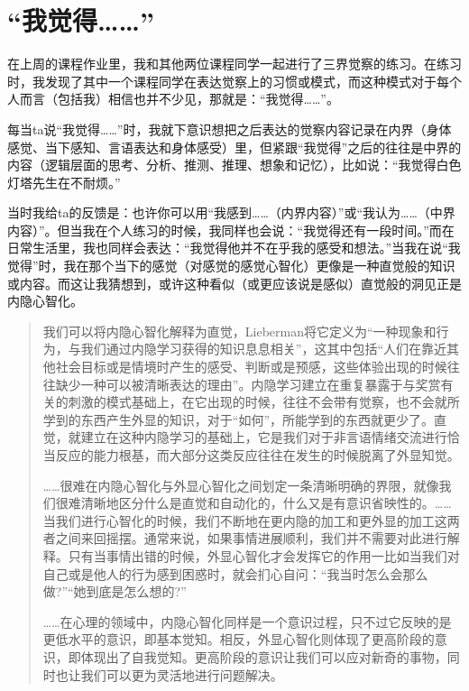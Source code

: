 \chapter{“我觉得……”}





在上周的课程作业里，我和其他两位课程同学一起进行了三界觉察的练习。在练习时，我发现了其中一个课程同学在表达觉察上的习惯或模式，而这种模式对于每个人而言（包括我）相信也并不少见，那就是：“我觉得……”。

每当ta说“我觉得……”时，我就下意识想把之后表达的觉察内容记录在内界（身体感觉、当下感知、言语表达和身体感受）里，但紧跟“我觉得”之后的往往是中界的内容（逻辑层面的思考、分析、推测、推理、想象和记忆），比如说：“我觉得白色灯塔先生在不耐烦。”

当时我给ta的反馈是：也许你可以用“我感到……（内界内容）”或“我认为……（中界内容）”。但当我在个人练习的时候，我同样也会说：“我觉得还有一段时间。”而在日常生活里，我也同样会表达：“我觉得他并不在乎我的感受和想法。”当我在说“我觉得”时，我在那个当下的感觉（对感觉的感觉\pozhehao{}心智化）更像是一种直觉般的知识或内容。而这让我猜想到，或许这种看似（或更应该说是感似）直觉般的洞见正是内隐心智化。

\blockquote{
我们可以将内隐心智化解释为直觉，Lieberman将它定义为“一种现象和行为，与我们通过内隐学习获得的知识息息相关”，这其中包括“人们在靠近其他社会目标或是情境时产生的感受、判断或是预感，这些体验出现的时候往往缺少一种可以被清晰表达的理由”。内隐学习建立在重复暴露于与奖赏有关的刺激的模式基础上，在它出现的时候，往往不会带有觉察，也不会就所学到的东西产生外显的知识，对于“如何”，所能学到的东西就更少了。直觉，就建立在这种内隐学习的基础上，它是我们对于非言语情绪交流进行恰当反应的能力根基，而大部分这类反应往往在发生的时候脱离了外显知觉。

……很难在内隐心智化与外显心智化之间划定一条清晰明确的界限，就像我们很难清晰地区分什么是直觉和自动化的，什么又是有意识省映性的。……当我们进行心智化的时候，我们不断地在更内隐的加工和更外显的加工这两者之间来回摇摆。通常来说，如果事情进展顺利，我们并不需要对此进行解释。只有当事情出错的时候，外显心智化才会发挥它的作用一比如当我们对自己或是他人的行为感到困惑时，就会扪心自问：“我当时怎么会那么做?”“她到底是怎么想的?”

……在心理的领域中，内隐心智化同样是一个意识过程，只不过它反映的是更低水平的意识，即基本觉知。相反，外显心智化则体现了更高阶段的意识，即体现出了自我觉知。更高阶段的意识让我们可以应对新奇的事物，同时也让我们可以更为灵活地进行问题解决。

}

